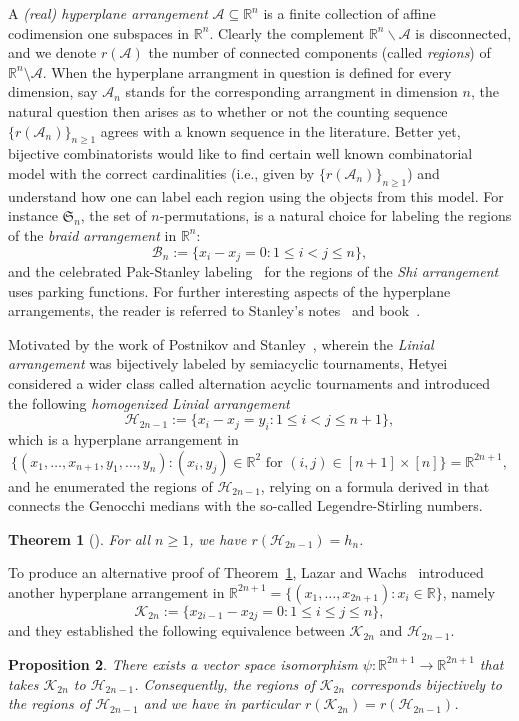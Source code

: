 \documentclass[11pt,reqno]{amsart}
\numberwithin{equation}{section}
\theoremstyle{plain}
\newtheorem{theorem}{Theorem}[section]
\newtheorem{proposition}[theorem]{Proposition}
\theoremstyle{definition}
\newcommand{\bR}{\mathbb{R}}
\newcommand{\A}{\mathcal{A}}
\newcommand{\B}{\mathcal{B}}
\renewcommand{\S}{\mathfrak{S}}
\newcommand{\cH}{\mathcal{H}}
\newcommand{\cK}{\mathcal{K}}
\begin{document}
A {\it (real) hyperplane arrangement} $\A\subseteq \bR^n$ is a finite collection of affine codimension one subspaces in $\bR^n$. Clearly the complement $\bR^n\backslash \A$ is disconnected, and we denote $r(\A)$ the number of connected components (called {\it regions}) of $\bR^n\setminus \A$. When the hyperplane arrangment in question is defined for every dimension, say $\A_n$ stands for the corresponding arrangment in dimension $n$, the natural question then arises as to whether or not the counting sequence $\{r(\A_n)\}_{n\ge 1}$ agrees with a known sequence in the literature. Better yet, bijective combinatorists would like to find certain well known combinatorial model with the correct cardinalities (i.e., given by $\{r(\A_n)\}_{n\ge 1}$) and understand how one can label each region using the objects from this model. For instance $\S_n$, the set of $n$-permutations, is a natural choice for labeling the regions of the {\it braid arrangement} in $\bR^n$:
$$\B_n:=\{x_i-x_j=0 : 1\le i < j\le n\},$$
and the celebrated Pak-Stanley labeling~\cite{sta96} for the regions of the {\it Shi arrangement} uses parking functions. For further interesting aspects of the hyperplane arrangements, the reader is referred to Stanley's notes~\cite{sta07} and book~\cite[Chapter~3.11]{sta11}.

Motivated by the work of Postnikov and Stanley~\cite{PS00}, wherein the {\it Linial arrangement} was bijectively labeled by semiacyclic tournaments, Hetyei~\cite{het19} considered a wider class called alternation acyclic tournaments and introduced the following {\it homogenized Linial arrangement}
$$\cH_{2n-1}:=\{x_i-x_j=y_i : 1\le i < j \le n+1\},$$
which is a hyperplane arrangement in 
$$\{(x_1,\ldots,x_{n+1},y_1,\ldots,y_n): (x_i,y_j)\in\bR^2\text{ for }(i,j)\in[n+1]\times[n]\}=\bR^{2n+1},$$
and he enumerated the regions of $\cH_{2n-1}$, relying on a formula derived in \cite[Corollary~5.5]{CKRT10} that connects the Genocchi medians with the so-called Legendre-Stirling numbers.
\begin{theorem}[{\cite[Thms. 4.3 \& 4.4]{het19}}]\label{thm:hetyei}
For all $n\ge 1$, we have $r(\cH_{2n-1})=h_n$.
\end{theorem}

To produce an alternative proof of Theorem~\ref{thm:hetyei}, Lazar and Wachs~\cite[Thm.~3.2]{LW22} introduced another hyperplane arrangement in $\bR^{2n+1}=\{(x_1,\ldots,x_{2n+1}):x_i\in\bR\}$, namely
$$\cK_{2n}:=\{x_{2i-1}-x_{2j}=0 : 1\le i \le j \le n\},$$
and they established the following equivalence between $\cK_{2n}$ and $\cH_{2n-1}$.
\begin{proposition}\label{prop:K2n}
There exists a vector space isomorphism $\psi:\bR^{2n+1}\to\bR^{2n+1}$ that takes $\cK_{2n}$ to $\cH_{2n-1}$. Consequently, the regions of $\cK_{2n}$ corresponds bijectively to the regions of $\cH_{2n-1}$ and we have in particular $r(\cK_{2n})=r(\cH_{2n-1})$.
\end{proposition}
\end{document}
